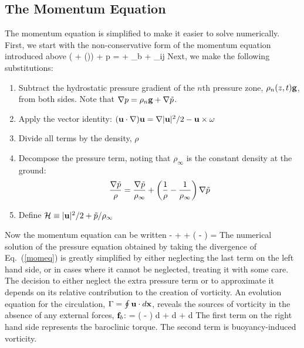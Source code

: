\documentclass[11pt]{book}
\begin{document}
\subsection{The Momentum Equation}

The momentum equation is simplified to make it easier to solve
numerically. First, we start with the non-conservative form of the momentum equation introduced above
\be \rho \left(  + (\bu \cdot \nabla)\bu  \right) + \nabla p = \rho \bg + \bof_b + \nabla \cdot \btau_{ij}  \ee
Next, we make the following substitutions:
\begin{enumerate}
\item Subtract the hydrostatic pressure gradient of the $n$th pressure zone, $\rho_n(z,t) {\bf g}$, from both sides. Note that
$\nabla p=\rho_n {\bf g} + \nabla \tilde{p}$.
\item Apply the vector identity: $({\bf u} \cdot \nabla) {\bf u} = \nabla|{\bf u}|^2/2 - {\bf u}\times{\bf \omega} $
\item Divide all terms by the density, $\rho$
\item Decompose the pressure term, noting that $\rho_\infty$ is the constant density at the ground:
   $$ \frac{\nabla \tilde{p}}{\rho} = \frac{\nabla \tilde{p}}{\rho_\infty} + \left( \frac{1}{\rho} -
   \frac{1}{\rho_\infty} \right) \nabla \tilde{p}  $$
\item Define ${\cal H} \equiv |{\bf u}|^2/2 + \tilde{p}/\rho_\infty $
\end{enumerate}
Now the momentum equation can be written
\be {} - \bu\times\bo +  + \left(  -
    \right) \nabla \tp =    \label{momeq} \ee
The numerical solution of the pressure equation obtained by taking the divergence of Eq.~(\ref{momeq})
is greatly simplified by either neglecting the last term on the left hand side, or
in cases where it cannot be neglected, treating it with some care.
The decision to either neglect the extra pressure term or to approximate it depends on its
relative contribution to the creation of vorticity. An evolution equation for the circulation, $\Gamma=\oint {\bf u} \cdot d{\bf x}$, reveals the
sources of vorticity in the absence of any external forces, ${\bf f}_b$:
\be {} =
    \oint \left( -  \right) \nabla \tp \cdot d\bx
  + \oint {} \bg \cdot d\bx
  + \oint {}  \cdot d\bx \ee
The first term on the right hand side represents the baroclinic torque.
The second term is buoyancy-induced vorticity.
\end{document}

